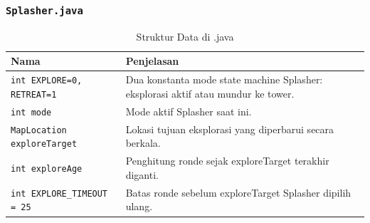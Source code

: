\documentclass{article}
\begin{document}
\begin{enumerate}[label=\alph*.]
\subsubsection{\lstinline|Splasher.java|}
\begin{longtable}{|p{}|p{}|}
    \caption{Struktur Data di .java} \\
\hline
\textbf{Nama} & \textbf{Penjelasan} \\
\hline
\endhead
\hline
\endfoot
\texttt{int EXPLORE=0, RETREAT=1} & Dua konstanta mode state machine Splasher: eksplorasi aktif atau mundur ke tower. \\
\hline
\texttt{int mode} & Mode aktif Splasher saat ini. \\
\hline
\texttt{MapLocation exploreTarget} & Lokasi tujuan eksplorasi yang diperbarui secara berkala. \\
\hline
\texttt{int exploreAge} & Penghitung ronde sejak exploreTarget terakhir diganti. \\
\hline
\texttt{int EXPLORE\_TIMEOUT = 25} & Batas ronde sebelum exploreTarget Splasher dipilih ulang. \\
\hline
\end{longtable}


\end{enumerate}
\end{document}
